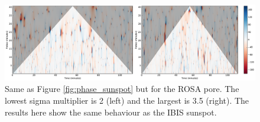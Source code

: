     \begin{figure}
     	\centering
     	\includegraphics[width=1\textwidth]{pore_phase.pdf}
     	\caption{
	             		Same as Figure \ref{fig:phase_sunspot} but for the ROSA pore.
	             		The lowest sigma multiplier is 2 (left) and the largest is 3.5 (right).
	             		The results here show the same behaviour as the IBIS sunspot.
     		          }
     	\label{fig:phase_pore}
    \end{figure}
